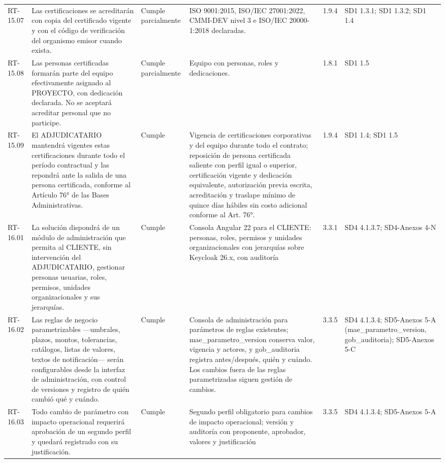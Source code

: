 \documentclass[carta,firma,final]{lafrox}
\begin{document}
\begin{landscape}
{\begin{longtable}{@{}F{0.070} F{0.255} F{0.075} F{0.280} F{0.090} F{0.230}@{}}
  RT-15.07 & Las certificaciones se acreditarán con copia del certificado vigente y con el código de verificación del organismo emisor cuando exista. & Cumple parcialmente & ISO 9001:2015, ISO/IEC 27001:2022, CMMI-DEV nivel 3 e ISO/IEC 20000-1:2018 declaradas. & 1.9.4 & SD1 1.3.1; SD1 1.3.2; SD1 1.4 \\
  RT-15.08 & Las personas certificadas formarán parte del equipo efectivamente asignado al PROYECTO, con dedicación declarada. No se aceptará acreditar personal que no participe. & Cumple parcialmente & Equipo con personas, roles y dedicaciones. & 1.8.1 & SD1 1.5 \\
  RT-15.09 & El ADJUDICATARIO mantendrá vigentes estas certificaciones durante todo el período contractual y las repondrá ante la salida de una persona certificada, conforme al Artículo 76° de las Bases Administrativas. & Cumple & Vigencia de certificaciones corporativas y del equipo durante todo el contrato; reposición de persona certificada saliente con perfil igual o superior, certificación vigente y dedicación equivalente, autorización previa escrita, acreditación y traslape mínimo de quince días hábiles sin costo adicional conforme al Art. 76°. & 1.9.4 & SD1 1.4; SD1 1.5 \\
  RT-16.01 & La solución dispondrá de un módulo de administración que permita al CLIENTE, sin intervención del ADJUDICATARIO, gestionar personas usuarias, roles, permisos, unidades organizacionales y sus jerarquías. & Cumple & Consola Angular 22 para el CLIENTE: personas, roles, permisos y unidades organizacionales con jerarquías sobre Keycloak 26.x, con auditoría & 3.3.1 & SD4 4.1.3.7; SD4-Anexos 4-N \\
  RT-16.02 & Las reglas de negocio parametrizables —umbrales, plazos, montos, tolerancias, catálogos, listas de valores, textos de notificación— serán configurables desde la interfaz de administración, con control de versiones y registro de quién cambió qué y cuándo. & Cumple & Consola de administración para parámetros de reglas existentes; mae\_parametro\_version conserva valor, vigencia y actores, y gob\_auditoria registra antes/después, quién y cuándo. Los cambios fuera de las reglas parametrizadas siguen gestión de cambios. & 3.3.5 & SD4 4.1.3.4; SD5-Anexos 5-A (mae\_parametro\_version, gob\_auditoria); SD5-Anexos 5-C \\
  RT-16.03 & Todo cambio de parámetro con impacto operacional requerirá aprobación de un segundo perfil y quedará registrado con su justificación. & Cumple & Segundo perfil obligatorio para cambios de impacto operacional; versión y auditoría con proponente, aprobador, valores y justificación & 3.3.5 & SD4 4.1.3.4; SD5-Anexos 5-A \\

\end{longtable}}
\end{landscape}
\end{document}
